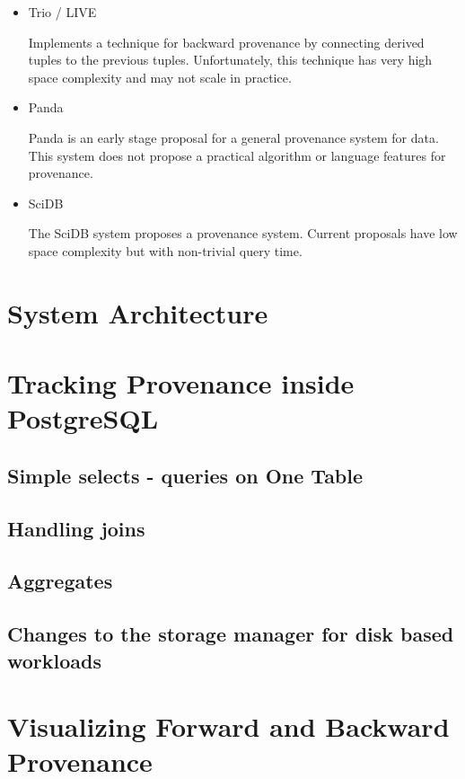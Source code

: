 \documentclass[11pt]{article}
\begin{document}
\begin{itemize}
\item Trio / LIVE \cite{widom2005trio, sarma2010live} 
  
Implements a technique for backward provenance by connecting derived tuples to the previous tuples. Unfortunately, this technique has very high space complexity and may not scale in practice. 

\item Panda \cite{ikeda2010panda} 

Panda is an early stage proposal for a general provenance system for data. This system does not propose a practical algorithm or language features for provenance. 

\item SciDB \cite{cudré2009demonstration}

The SciDB system proposes a provenance system. Current proposals have low space complexity but with non-trivial query time. 

\end{itemize}

\section{System Architecture}

\section{Tracking Provenance inside PostgreSQL}

\subsection{Simple selects - queries on One Table}

\subsection{Handling joins}

\subsection{Aggregates}

\subsection{Changes to the storage manager for disk based workloads}

\section{Visualizing Forward and Backward Provenance}
\end{document}
